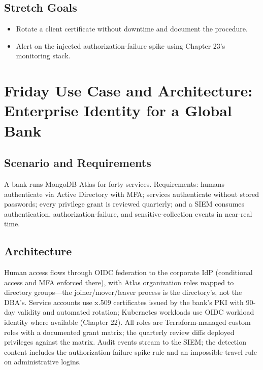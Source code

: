 \subsection*{Stretch Goals}
\begin{itemize}
    \item Rotate a client certificate without downtime and document the procedure.
    \item Alert on the injected authorization-failure spike using Chapter 23's monitoring stack.
\end{itemize}

\section{Friday Use Case and Architecture: Enterprise Identity for a Global Bank}
\subsection{Scenario and Requirements}
A bank runs MongoDB Atlas for forty services. Requirements: humans authenticate via Active Directory with MFA; services authenticate without stored passwords; every privilege grant is reviewed quarterly; and a SIEM consumes authentication, authorization-failure, and sensitive-collection events in near-real time.

\subsection{Architecture}
Human access flows through OIDC federation to the corporate IdP (conditional access and MFA enforced there), with Atlas organization roles mapped to directory groups---the joiner/mover/leaver process is the directory's, not the DBA's. Service accounts use x.509 certificates issued by the bank's PKI with 90-day validity and automated rotation; Kubernetes workloads use OIDC workload identity where available (Chapter 22). All roles are Terraform-managed custom roles with a documented grant matrix; the quarterly review diffs deployed privileges against the matrix. Audit events stream to the SIEM; the detection content includes the authorization-failure-spike rule and an impossible-travel rule on administrative logins.


